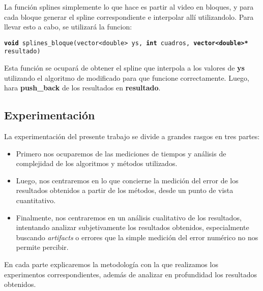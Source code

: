 La función splines simplemente lo que hace es partir al video en bloques, y para cada bloque generar el spline correspondiente e interpolar allí utilizandolo. Para llevar esto a cabo, se utilizará la funcion:


\texttt{\textbf{void} splines\_bloque(vector<double> ys, \textbf{int} cuadros, \textbf{vector<double>*} resultado)}

Esta función se ocupará de obtener el spline que interpola a los valores de \textbf{ys} utilizando el algoritmo de \cite{burden} modificado para que funcione correctamente. Luego, hara \textbf{push\_back} de los resultados en  \textbf{resultado}.




\subsection{Experimentación}

La experimentación del presente trabajo se divide a grandes rasgos en tres partes:

\begin{itemize}
    \item Primero nos ocuparemos de las mediciones de tiempos y análisis de complejidad de los algoritmos y métodos utilizados.
    \item Luego, nos centraremos en lo que concierne la medición del error de los resultados obtenidos a partir de los métodos, desde un punto de vista cuantitativo.
    \item Finalmente, nos centraremos en un análisis cualitativo de los resultados, intentando analizar subjetivamente los resultados obtenidos, especialmente buscando \emph{artifacts} o errores que la simple medición del error numérico no nos permite percibir.
\end{itemize}

En cada parte explicaremos la metodología con la que realizamos los experimentos correspondientes, además de analizar en profundidad los resultados obtenidos.




